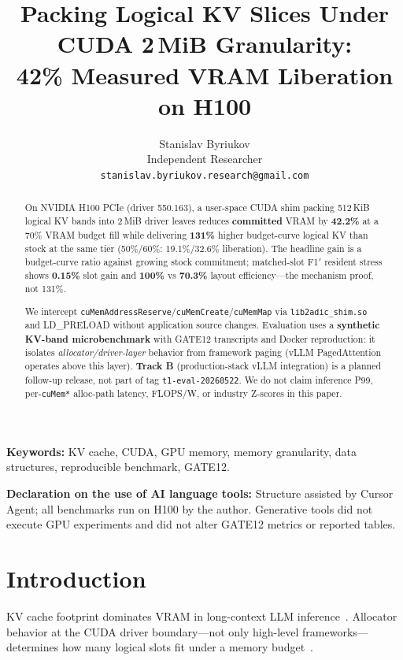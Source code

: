 \documentclass[11pt]{article}
\title{Packing Logical KV Slices Under CUDA 2\,MiB Granularity:\\
42\% Measured VRAM Liberation on H100}
\author{
Stanislav Byriukov \\
Independent Researcher \\
\texttt{stanislav.byriukov.research@gmail.com}
}
\date{}
\begin{document}
\maketitle

\begin{abstract}
On NVIDIA H100 PCIe (driver 550.163), a user-space CUDA shim packing 512\,KiB logical KV bands into 2\,MiB driver leaves reduces \textbf{committed} VRAM by \textbf{42.2\%} at a 70\% VRAM budget fill while delivering \textbf{131\%} higher budget-curve logical KV than stock at the same tier (50\%/60\%: 19.1\%/32.6\% liberation).
The headline gain is a budget-curve ratio against growing stock commitment; matched-slot F1$'$ resident stress shows \textbf{0.15\%} slot gain and \textbf{100\%} vs \textbf{70.3\%} layout efficiency---the mechanism proof, not 131\%.

We intercept \texttt{cuMemAddressReserve}/\texttt{cuMemCreate}/\texttt{cuMemMap} via \texttt{lib2adic\_shim.so} and LD\_PRELOAD without application source changes.
Evaluation uses a \textbf{synthetic KV-band microbenchmark} with GATE12 transcripts and Docker reproduction: it isolates \emph{allocator/driver-layer} behavior from framework paging (vLLM PagedAttention operates above this layer).
\textbf{Track B} (production-stack vLLM integration) is a planned follow-up release, not part of tag \texttt{t1-eval-20260522}.
We do not claim inference P99, per-\texttt{cuMem*} alloc-path latency, FLOPS/W, or industry Z-scores in this paper.
\end{abstract}

\noindent\textbf{Keywords:} KV cache, CUDA, GPU memory, memory granularity, data structures, reproducible benchmark, GATE12.

\medskip
\noindent\textbf{Declaration on the use of AI language tools:}
Structure assisted by Cursor Agent; all benchmarks run on H100 by the author.
Generative tools did not execute GPU experiments and did not alter GATE12 metrics or reported tables.

\section{Introduction}

KV cache footprint dominates VRAM in long-context LLM inference~\cite{vllm,attention_is_all_you_need}.
Allocator behavior at the CUDA driver boundary---not only high-level frameworks---determines how many logical slots fit under a memory budget~\cite{cuda_prog_guide,cuda_driver_cuMem}.
\end{document}
